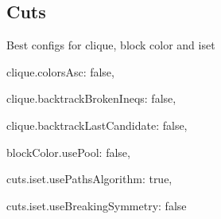 
\subsection{Cuts}
\label{subsec:resultscuts}

Best configs for clique, block color and iset

clique.colorsAsc: false,

clique.backtrackBrokenIneqs: false,

clique.backtrackLastCandidate: false,

blockColor.usePool: false,

cuts.iset.usePathsAlgorithm: true,

cuts.iset.useBreakingSymmetry: false